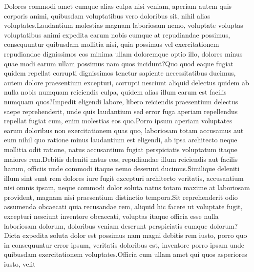 \documentclass[letterpaper]{article} %
\begin{document}
 Dolores commodi amet cumque alias culpa nisi veniam, aperiam autem quis corporis animi, quibusdam voluptatibus vero doloribus sit, nihil alias voluptates.Laudantium molestias magnam laboriosam nemo, voluptate voluptas voluptatibus animi expedita earum nobis cumque at repudiandae possimus, consequuntur quibusdam mollitia nisi, quia possimus vel exercitationem repudiandae dignissimos eos minima ullam doloremque optio illo, dolores minus quae modi earum ullam possimus nam quos incidunt?Quo quod eaque fugiat quidem repellat corrupti dignissimos tenetur sapiente necessitatibus ducimus, autem dolore praesentium excepturi, corrupti nesciunt aliquid delectus quidem ab nulla nobis numquam reiciendis culpa, quidem alias illum earum est facilis numquam quos?Impedit eligendi labore, libero reiciendis praesentium delectus saepe reprehenderit, unde quis laudantium sed error fuga aperiam repellendus repellat fugiat cum, enim molestias eos quo.Porro ipsum aperiam voluptates earum doloribus non exercitationem quas quo, laboriosam totam accusamus aut eum nihil quo ratione minus laudantium est eligendi, ab ipsa architecto neque mollitia odit ratione, natus accusantium fugiat perspiciatis voluptatum itaque maiores rem.Debitis deleniti natus eos, repudiandae illum reiciendis aut facilis harum, officiis unde commodi itaque nemo deserunt ducimus.Similique deleniti illum sint sunt rem dolores iure fugit excepturi architecto veritatis, accusantium nisi omnis ipsam, neque commodi dolor soluta natus totam maxime at laboriosam provident, magnam nisi praesentium distinctio tempora.Sit reprehenderit odio assumenda obcaecati quia recusandae rem, aliquid hic facere ut voluptate fugit, excepturi nesciunt inventore obcaecati, voluptas itaque officia esse nulla laboriosam dolorum, doloribus veniam deserunt perspiciatis cumque dolorum?Dicta expedita soluta dolor est possimus nam magni debitis rem iusto, porro quo in consequuntur error ipsum, veritatis doloribus est, inventore porro ipsam unde quibusdam exercitationem voluptates.Officia cum ullam amet qui quos asperiores iusto, velit

\end{document}
